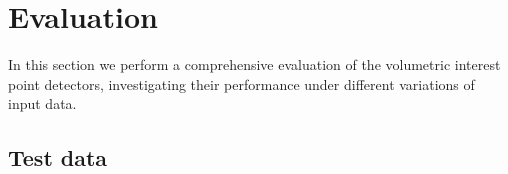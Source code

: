 \section{Evaluation}
\label{sec/eval/experiments}
In this section we perform a comprehensive evaluation of the volumetric interest point detectors, investigating their performance under different variations of input data. 

\subsection{Test data}
\label{sec/eval/testdata}


